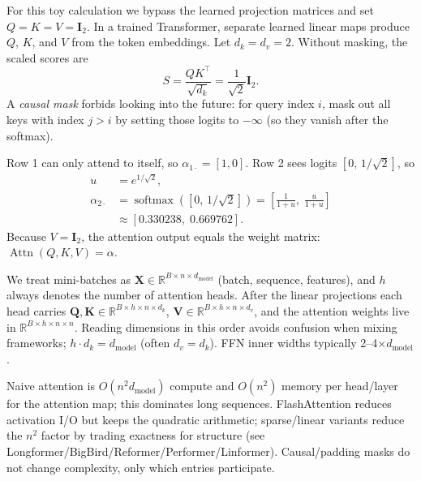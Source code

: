 \begin{tcolorbox}[summarybox, title={Worked example: 2-token causal self-attention (one head)}]
For this toy calculation we bypass the learned projection matrices and set \(Q=K=V=\mathbf{I}_2\). In a trained Transformer, separate learned linear maps produce \(Q\), \(K\), and \(V\) from the token embeddings. Let \(d_k=d_v=2\). Without masking, the scaled scores are
\[
S=\frac{QK^\top}{\sqrt{d_k}}=\frac{1}{\sqrt{2}}\mathbf{I}_2.
\]
A \emph{causal mask} forbids looking into the future: for query index \(i\), mask out all keys with index \(j>i\) by setting those logits to \(-\infty\) (so they vanish after the softmax).

Row 1 can only attend to itself, so \(\alpha_{1\cdot}=[1,0]\). Row 2 sees logits \([0,\,1/\sqrt{2}]\), so
\[
\begin{aligned}
u &= e^{1/\sqrt{2}},\\
\alpha_{2\cdot} &= \operatorname{softmax}\!\left([0,\,1/\sqrt{2}]\right)
= \left[\frac{1}{1+u},\;\frac{u}{1+u}\right]\\
&\approx[0.330238,\;0.669762].
\end{aligned}
\]
Because \(V=\mathbf{I}_2\), the attention output equals the weight matrix: \(\operatorname{Attn}(Q,K,V)=\alpha\).
\end{tcolorbox}

\begin{tcolorbox}[summarybox, title={Shape ledger}]
We treat mini\hyp{}batches as \(\mathbf{X}\in\mathbb{R}^{B\times n \times d_{\text{model}}}\) (batch, sequence, features), and \(h\) always denotes the number of attention heads. After the linear projections each head carries \(\mathbf{Q},\mathbf{K}\in\mathbb{R}^{B\times h \times n \times d_k}\), \(\mathbf{V}\in\mathbb{R}^{B\times h \times n \times d_v}\), and the attention weights live in \(\mathbb{R}^{B\times h \times n \times n}\). Reading dimensions in this order avoids confusion when mixing frameworks; \(h\cdot d_k = d_{\text{model}}\) (often \(d_v=d_k\)). FFN inner widths typically 2--4$\times d_{\text{model}}$.
\end{tcolorbox}

\begin{tcolorbox}[summarybox, title={Complexity and memory}]
Naive attention is \(O(n^2 d_{\text{model}})\) compute and \(O(n^2)\) memory per head/layer for the attention map; this dominates long sequences. FlashAttention reduces activation I/O but keeps the quadratic arithmetic; sparse/linear variants reduce the \(n^2\) factor by trading exactness for structure (see Longformer/BigBird/Reformer/Performer/Linformer). Causal/padding masks do not change complexity, only which entries participate.
\end{tcolorbox}

